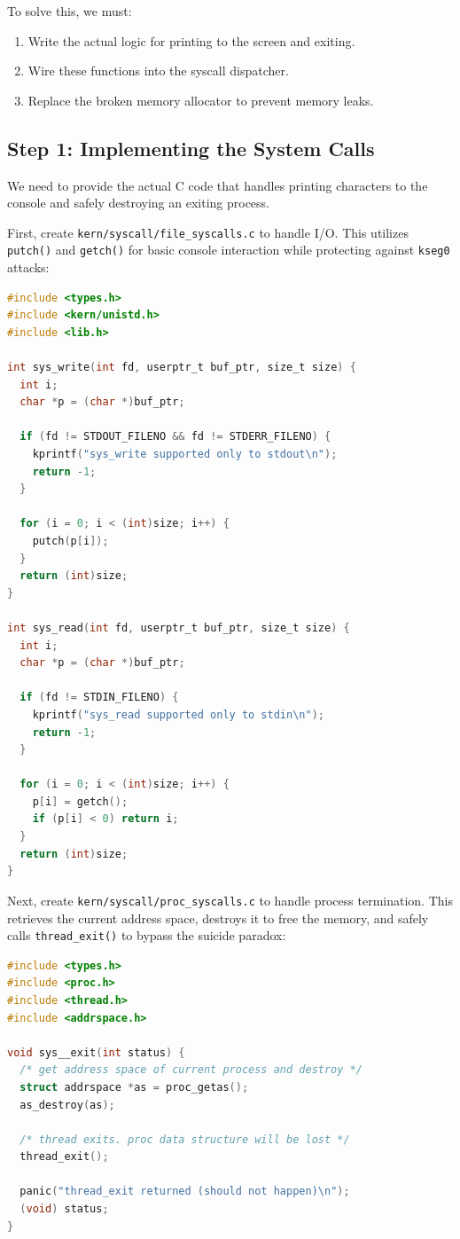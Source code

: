 To solve this, we must:
\begin{enumerate}
    \item Write the actual logic for printing to the screen and exiting.
    \item Wire these functions into the syscall dispatcher.
    \item Replace the broken memory allocator to prevent memory leaks.
\end{enumerate}

\subsection{Step 1: Implementing the System Calls}
We need to provide the actual C code that handles printing characters to the console and safely destroying an exiting process. 

First, create \texttt{kern/syscall/file\_syscalls.c} to handle I/O. This utilizes \texttt{putch()} and \texttt{getch()} for basic console interaction while protecting against \texttt{kseg0} attacks:
\begin{lstlisting}[language=C]
#include <types.h>
#include <kern/unistd.h>
#include <lib.h>

int sys_write(int fd, userptr_t buf_ptr, size_t size) {
  int i;
  char *p = (char *)buf_ptr;

  if (fd != STDOUT_FILENO && fd != STDERR_FILENO) {
    kprintf("sys_write supported only to stdout\n");
    return -1;
  }

  for (i = 0; i < (int)size; i++) {
    putch(p[i]);
  }
  return (int)size;
}

int sys_read(int fd, userptr_t buf_ptr, size_t size) {
  int i;
  char *p = (char *)buf_ptr;

  if (fd != STDIN_FILENO) {
    kprintf("sys_read supported only to stdin\n");
    return -1;
  }

  for (i = 0; i < (int)size; i++) {
    p[i] = getch();
    if (p[i] < 0) return i;
  }
  return (int)size;
}
\end{lstlisting}

Next, create \texttt{kern/syscall/proc\_syscalls.c} to handle process termination. This retrieves the current address space, destroys it to free the memory, and safely calls \texttt{thread\_exit()} to bypass the suicide paradox:
\begin{lstlisting}[language=C]
#include <types.h>
#include <proc.h>
#include <thread.h>
#include <addrspace.h>

void sys__exit(int status) {
  /* get address space of current process and destroy */
  struct addrspace *as = proc_getas();
  as_destroy(as);
  
  /* thread exits. proc data structure will be lost */
  thread_exit();

  panic("thread_exit returned (should not happen)\n");
  (void) status;
}
\end{lstlisting}

